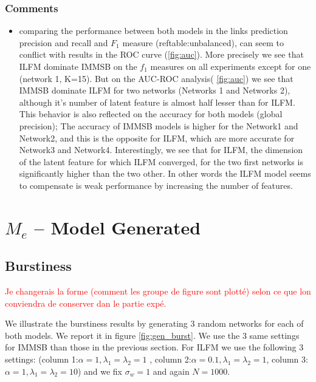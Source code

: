 \documentclass[a4paper, 12pt]{article}
\begin{document}




\subsubsection{Comments}

\begin{itemize}
\item comparing the performance between both models in the links prediction precision and recall and $F_1$ measure (ref{table:unbalanced}), can seem to conflict with results in the ROC curve (\ref{fig:auc}). More precisely we see that ILFM dominate IMMSB on the $f_1$ measures on all experiments except for one (network 1, K=15). But on the AUC-ROC analysis( \ref{fig:auc}) we see that IMMSB dominate ILFM for two networks (Networks 1 and Networks 2), although it's number of latent feature is almost half lesser than for ILFM. This behavior is also reflected on the accuracy for both models (global precision); The accuracy of IMMSB models is higher for the Network1 and Network2, and this is the opposite for ILFM, which are more accurate for Network3 and Network4. Interestingly, we see that for ILFM, the dimension of the latent feature for which ILFM converged, for the two first networks is significantly higher than the two other. In other words the ILFM model seems to compensate is weak performance by increasing the number of features.
 
\end{itemize}

\section{$M_e$ -- Model Generated}
\label{sec:mgmg}

\subsection{Burstiness}

\textcolor{red}{Je changerais la forme (comment les groupe de figure sont plotté) selon ce que lon conviendra de conserver dan le partie expé.}

We illustrate the burstiness results by generating 3 random networks for each of both models. We report it in figure \ref{fig:gen_burst}. We use the 3 same settings for IMMSB  than those in the previous section. For ILFM  we use the following 3 settings: (column 1:$\alpha=1,  \lambda_1=\lambda_2=1$ , column 2:$\alpha=0.1, \lambda_1=\lambda_2=1$, column 3: $\alpha=1, \lambda_1=\lambda_2=10$) and we fix $\sigma_w=1$ and again $N=1000$.
\end{document}
